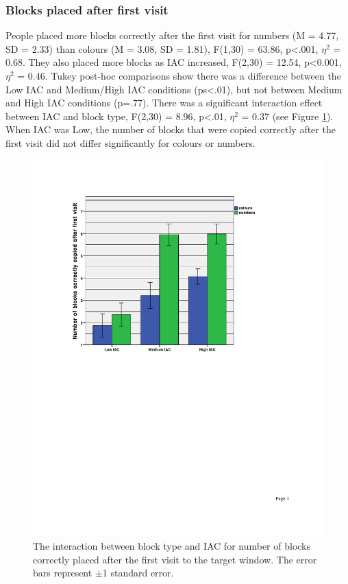 \documentclass[11pt,oneside]{report}
\begin{document}
\begin{table}
\subsubsection{Blocks placed after first visit}
People placed more blocks correctly after the first visit for numbers (M = 4.77, SD = 2.33) than colours (M = 3.08, SD = 1.81), F(1,30) = 63.86, p<.001, $\eta^2$  = 0.68. They also placed more blocks as IAC increased, F(2,30) = 12.54, p<0.001, $\eta^2$  = 0.46. Tukey post-hoc comparisons show there was a difference between the Low IAC and Medium/High IAC conditions (ps<.01), but not between Medium and High IAC conditions (p=.77). There was a significant interaction effect between IAC and block type, F(2,30) = 8.96, p<.01, $\eta^2$  = 0.37  (see Figure \ref{fig:ch4_firstCorrectBlocks}). When IAC was Low, the number of blocks that were copied correctly after the first visit did not differ significantly for colours or numbers.

\begin{figure}[!ht]
\centering
\includegraphics[width=\textwidth]{images/Study2/ch4_firstCorrectBlocks-bargraph.pdf}
\caption{The interaction between block type and IAC for number of blocks correctly placed after the first visit to the target window. The error bars represent $\pm $1 standard error.}
\vspace{-9pt}
\label{fig:ch4_firstCorrectBlocks}
\end{figure}


\end{table}
\end{document}

